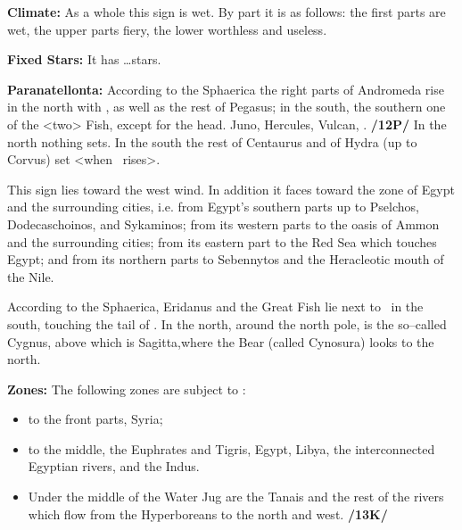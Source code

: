 \textbf{Climate:} As a whole this sign is wet. By part it is as follows: the first parts are wet, the upper parts fiery, the lower worthless and useless. 

\textbf{Fixed Stars:} It has …stars. 

\textbf{Paranatellonta:} According to the Sphaerica the right parts of Andromeda rise in the north with \Aquarius, as well as the rest of Pegasus; in the south, the southern one of the <two> Fish, except for the head. Juno, Hercules, Vulcan, \Saturn. \textbf{/12P/} In the north nothing sets. In the south
the rest of Centaurus and of Hydra (up to Corvus) set <when \Aquarius\, rises>. 

This sign lies toward the west wind. In addition it faces toward the zone of Egypt and the surrounding cities, i.e. from Egypt’s southern parts up to Pselchos, Dodecaschoinos, and Sykaminos; from its western parts to the oasis of Ammon and the surrounding cities; from its eastern part to the Red Sea which touches Egypt; and from its northern parts to Sebennytos and the Heracleotic mouth of the Nile.

According to the Sphaerica, Eridanus and the Great Fish lie next to \Aquarius\, in the south, touching the tail of \Capricorn. In the north, around the north pole, is the so–called Cygnus, above which is Sagitta,where the Bear (called Cynosura) looks to the north. 

\textbf{Zones:} The following zones are subject to \Aquarius:
\begin{itemize}
\item to the front parts, Syria; 
\item to the middle, the Euphrates and Tigris, Egypt, Libya, the interconnected Egyptian rivers, and the Indus. 
\item Under the middle of the Water Jug are the Tanais and the rest of the rivers which flow from the Hyperboreans to the north and west. \textbf{/13K/}
\end{itemize}


